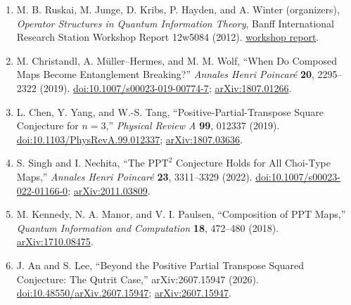 \begin{enumerate}[label={},leftmargin=4.8em,labelsep=0.5em]
  \footnotesize
  \item[\textup{[BIRS12]}]\label{ref:p32-birs}
  M. B. Ruskai, M. Junge, D. Kribs, P. Hayden, and A. Winter (organizers),
  \emph{Operator Structures in Quantum Information Theory}, Banff
  International Research Station Workshop Report 12w5084 (2012).
  \href{https://www.birs.ca/workshops/2012/12w5084/report12w5084.pdf}{workshop report}.

  \item[\textup{[CMW19]}]\label{ref:p32-christandl}
  M. Christandl, A. M\"uller--Hermes, and M. M. Wolf, ``When Do Composed Maps
  Become Entanglement Breaking?'' \emph{Annales Henri Poincar\'e} \textbf{20},
  2295--2322 (2019).
  \href{https://doi.org/10.1007/s00023-019-00774-7}{doi:10.1007/s00023-019-00774-7};
  \href{https://arxiv.org/abs/1807.01266}{arXiv:1807.01266}.

  \item[\textup{[CYT19]}]\label{ref:p32-chen}
  L. Chen, Y. Yang, and W.-S. Tang, ``Positive-Partial-Transpose Square
  Conjecture for $n=3$,'' \emph{Physical Review A} \textbf{99}, 012337
  (2019). \href{https://doi.org/10.1103/PhysRevA.99.012337}{doi:10.1103/PhysRevA.99.012337};
  \href{https://arxiv.org/abs/1807.03636}{arXiv:1807.03636}.

  \item[\textup{[SN22]}]\label{ref:p32-singh}
  S. Singh and I. Nechita, ``The $\mathrm{PPT}^2$ Conjecture Holds for All
  Choi-Type Maps,'' \emph{Annales Henri Poincar\'e} \textbf{23}, 3311--3329
  (2022). \href{https://doi.org/10.1007/s00023-022-01166-0}{doi:10.1007/s00023-022-01166-0};
  \href{https://arxiv.org/abs/2011.03809}{arXiv:2011.03809}.

  \item[\textup{[KMP18]}]\label{ref:p32-kennedy}
  M. Kennedy, N. A. Manor, and V. I. Paulsen, ``Composition of PPT Maps,''
  \emph{Quantum Information and Computation} \textbf{18}, 472--480 (2018).
  \href{https://arxiv.org/abs/1710.08475}{arXiv:1710.08475}.

  \item[\textup{[AL26]}]\label{ref:p32-an-lee}
  J. An and S. Lee, ``Beyond the Positive Partial Transpose Squared
  Conjecture: The Qutrit Case,'' arXiv:2607.15947 (2026).
  \href{https://doi.org/10.48550/arXiv.2607.15947}{doi:10.48550/arXiv.2607.15947};
  \href{https://arxiv.org/abs/2607.15947}{arXiv:2607.15947}.
\end{enumerate}

